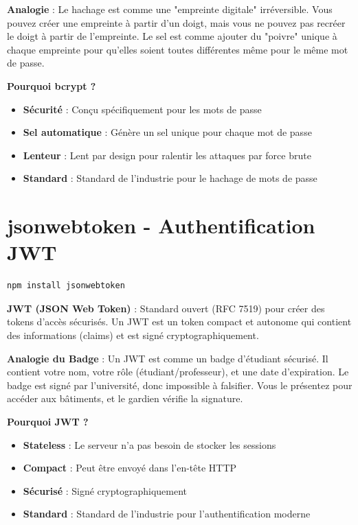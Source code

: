 \begin{analogybox}
    \textbf{Analogie} : Le hachage est comme une "empreinte digitale" irréversible. Vous pouvez créer une empreinte à partir d'un doigt, mais vous ne pouvez pas recréer le doigt à partir de l'empreinte. Le sel est comme ajouter du "poivre" unique à chaque empreinte pour qu'elles soient toutes différentes même pour le même mot de passe.
\end{analogybox}

\textbf{Pourquoi bcrypt ?}
\begin{itemize}
    \item \textbf{Sécurité} : Conçu spécifiquement pour les mots de passe
    \item \textbf{Sel automatique} : Génère un sel unique pour chaque mot de passe
    \item \textbf{Lenteur} : Lent par design pour ralentir les attaques par force brute
    \item \textbf{Standard} : Standard de l'industrie pour le hachage de mots de passe
\end{itemize}

\section{jsonwebtoken - Authentification JWT}

\begin{lstlisting}[style=bash, caption=Installation de jsonwebtoken]
npm install jsonwebtoken
\end{lstlisting}

\begin{definitionbox}
    \textbf{JWT (JSON Web Token)} : Standard ouvert (RFC 7519) pour créer des tokens d'accès sécurisés. Un JWT est un token compact et autonome qui contient des informations (claims) et est signé cryptographiquement.
\end{definitionbox}

\begin{analogybox}
    \textbf{Analogie du Badge} : Un JWT est comme un badge d'étudiant sécurisé. Il contient votre nom, votre rôle (étudiant/professeur), et une date d'expiration. Le badge est signé par l'université, donc impossible à falsifier. Vous le présentez pour accéder aux bâtiments, et le gardien vérifie la signature.
\end{analogybox}

\textbf{Pourquoi JWT ?}
\begin{itemize}
    \item \textbf{Stateless} : Le serveur n'a pas besoin de stocker les sessions
    \item \textbf{Compact} : Peut être envoyé dans l'en-tête HTTP
    \item \textbf{Sécurisé} : Signé cryptographiquement
    \item \textbf{Standard} : Standard de l'industrie pour l'authentification moderne
\end{itemize}

